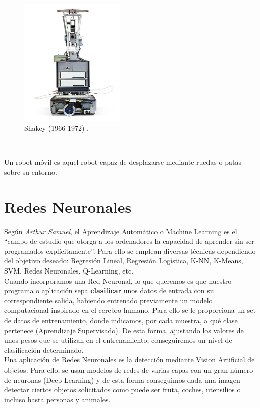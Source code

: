 \begin{figure} [h!]
  \begin{center}
    \includegraphics[width=5cm]{imagenes/shakey.jpg}
  \end{center}
  \caption[Shakey (1966-1972)]{Shakey (1966-1972) \cite{shakey-the-robot}.}
  \label{fig:shakey}
\end{figure}\

Un robot móvil es aquel robot capaz de desplazarse mediante ruedas o patas sobre su entorno.

\section{Redes Neuronales}
\label{sec:redes_neuronales}

Según \emph{Arthur Samuel}, el Aprendizaje Automático o Machine Learning es el ``campo de estudio que otorga a los ordenadores la capacidad de aprender sin ser programados explícitamente''. Para ello se emplean diversas técnicas dependiendo del objetivo deseado: Regresión Lineal, Regresión Logística, K-NN, K-Means, SVM, Redes Neuronales, Q-Learning, etc.
\\

Cuando incorporamos una Red Neuronal, lo que queremos es que nuestro programa o aplicación sepa \textbf{clasificar} unos datos de entrada con su correspondiente salida, habiendo entrenado previamente un modelo computacional inspirado en el cerebro humano. Para ello se le proporciona un set de datos de entrenamiento, donde indicamos, por cada muestra, a qué clase pertenece (Aprendizaje Supervisado). De esta forma, ajustando los valores de unos pesos que se utilizan en el entrenamiento, conseguiremos un nivel de clasificación determinado.\\

Una aplicación de Redes Neuronales es la detección mediante Vision Artificial de objetos. Para ello, se usan modelos de redes de varias capas con un gran número de neuronas (Deep Learning) y de esta forma conseguimos dada una imagen detectar ciertos objetos solicitados como puede ser fruta, coches, utensilios o incluso hasta personas y animales.\\

